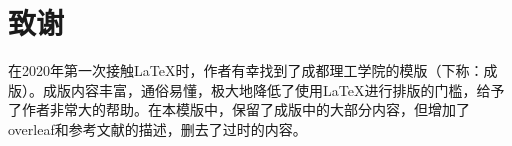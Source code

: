 \section{致谢}
在2020年第一次接触\LaTeX 时，作者有幸找到了成都理工学院的模版（下称：成版）。成版内容丰富，通俗易懂，极大地降低了使用\LaTeX 进行排版的门槛，给予了作者非常大的帮助。在本模版中，保留了成版中的大部分内容，但增加了overleaf和参考文献的描述，删去了过时的内容。